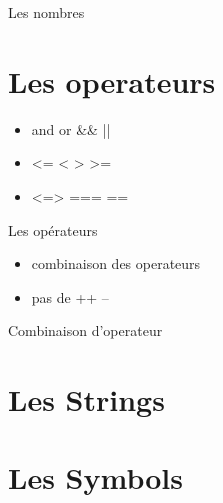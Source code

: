 \documentclass{beamer}
\begin{document}
\begin{frame}
  \begin{beamerboxesrounded}{Les nombres}
    
  \end{beamerboxesrounded}
\end{frame}

\section{Les operateurs}

\begin{frame}
  \begin{itemize}
    \item and or && ||
    \item <= < > >=
    \item <=> === ==
  \end{itemize}
\end{frame}

\begin{frame}
  \begin{beamerboxesrounded}{Les op\'erateurs}
    
  \end{beamerboxesrounded}
\end{frame}

\begin{frame}
  \begin{itemize}
    \item combinaison des operateurs
    \item pas de ++ --
  \end{itemize}
\end{frame}

\begin{frame}
  \begin{beamerboxesrounded}{Combinaison d'operateur}
    
  \end{beamerboxesrounded}
\end{frame}

\section{Les Strings}
\section{Les Symbols}
\end{document}
